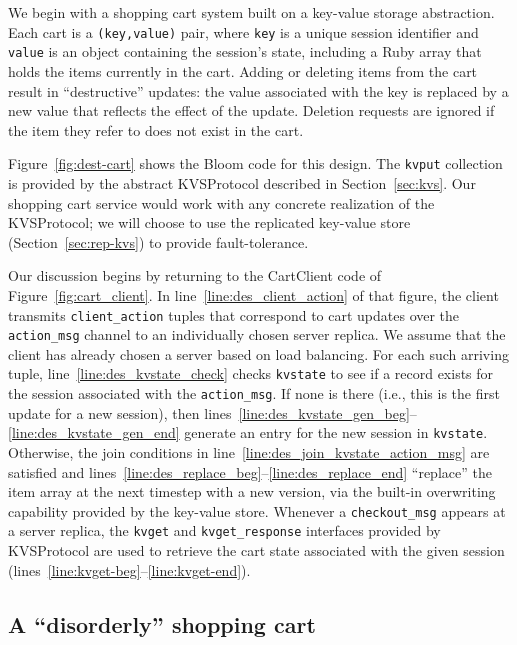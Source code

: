 We begin with a shopping cart system built on a key-value storage abstraction.
Each cart is a \texttt{(key,value)} pair, where \texttt{key} is a unique session
identifier and \texttt{value} is an object containing the session's state,
including a Ruby array that holds the items currently in the cart. Adding or deleting
items from the cart result in ``destructive'' updates: the value associated with
the key is replaced by a new value that reflects the effect of the
update. Deletion requests are ignored if the item they refer to does not exist
in the cart.

Figure~\ref{fig:dest-cart} shows the Bloom code for this design. The
\texttt{kvput} collection is provided by the abstract KVSProtocol described in
Section~\ref{sec:kvs}. Our shopping cart service would work with any concrete
realization of the KVSProtocol; we will choose to use the replicated key-value
store (Section~\ref{sec:rep-kvs}) to provide fault-tolerance.

  Our discussion begins by
returning to the CartClient code of Figure~\ref{fig:cart_client}.  In
line~\ref{line:des_client_action} of that figure, the client transmits
\texttt{client\_action} tuples that correspond to cart updates over the
\texttt{action\_msg} channel to an individually chosen server replica.  We
assume that the client has already chosen a server based on load balancing.  For
each such arriving tuple, line~\ref{line:des_kvstate_check} checks
\texttt{kvstate} to see if a record exists for the session associated with the
\texttt{action\_msg}.  If none is there (i.e., this is the first update for a
new session), then
lines~\ref{line:des_kvstate_gen_beg}--\ref{line:des_kvstate_gen_end} generate an
entry for the new session in \texttt{kvstate}.  Otherwise, the join conditions
in line~\ref{line:des_join_kvstate_action_msg} are satisfied and
lines~\ref{line:des_replace_beg}--\ref{line:des_replace_end} ``replace'' the
item array at the next timestep with a new version, via the built-in overwriting
capability provided by the key-value store.  Whenever a \texttt{checkout\_msg}
appears at a server replica, the \texttt{kvget} and \texttt{kvget\_response}
interfaces provided by KVSProtocol are used to retrieve the cart state
associated with the given session
(lines~\ref{line:kvget-beg}--\ref{line:kvget-end}).


\subsection{A ``disorderly'' shopping cart}

